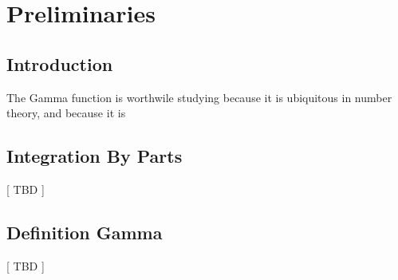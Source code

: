 \newpage
\section{Preliminaries}

\subsection{Introduction}
The Gamma function is worthwile studying because it is ubiquitous in number theory, and because it is   

\subsection{Integration By Parts}
[ TBD ]

\subsection{Definition Gamma}
[ TBD ]

